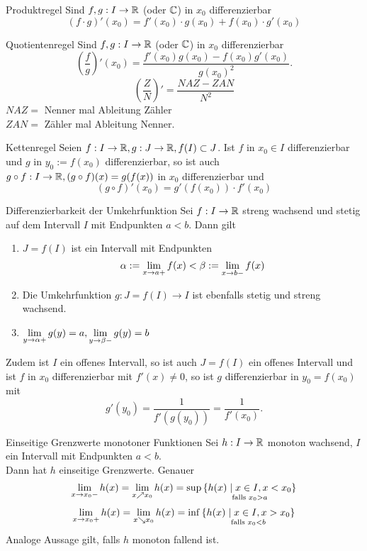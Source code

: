 \documentclass[main.tex]{subfiles}
\begin{document}
\begin{karte}{Produktregel}
    Sind \( f, g: I \rightarrow \mathbb{R} \) (oder \( \mathbb{C} \)) in \(x_0\)
    differenzierbar
    \[ (f \cdot g)'(x_0) = f'(x_0) \cdot g(x_0) 
    + f(x_0) \cdot g'(x_0) \]
\end{karte}
\begin{karte}{Quotientenregel}
    Sind \( f, g: I \rightarrow \mathbb{R} \) (oder \( \mathbb{C} \)) in \(x_0\)
    differenzierbar
    \[ \left( \frac{f}{g} \right)'(x_0) 
    = \frac{ f'(x_0) g(x_0) - f(x_0) g'(x_0) }{ {g(x_0)}^2 }. \]
    \[ \left(\frac{Z}{N}\right)' = \frac{NAZ - ZAN}{N^2} \]
    \( NAZ = \) Nenner mal Ableitung Zähler\\
    \( ZAN = \) Zähler mal Ableitung Nenner.
\end{karte}
\begin{karte}{Kettenregel}
    Seien \( f: I \rightarrow \mathbb{R}, g : J \rightarrow \mathbb{R}, f(I) \subset J \). 
    Ist \( f \) in \( x_0 \in I \) differenzierbar und \(g\) in 
    \( y_0 := f(x_0) \) differenzierbar, so ist auch 
    \( g \circ f : I \rightarrow \mathbb{R}, (g \circ f)(x) = g(f(x)) \) in \(x_0\) 
    differenzierbar und 
    \[ (g \circ f)'(x_0) = g'(f(x_0)) \cdot f'(x_0) \]
\end{karte}
\begin{karte}{Differenzierbarkeit der Umkehrfunktion}
    Sei \( f: I \rightarrow \mathbb{R} \) streng wachsend und stetig auf 
    dem Intervall \(I\) mit Endpunkten \( a < b \). Dann gilt 
    \begin{enumerate}
        \item \( J = f(I) \) ist ein Intervall mit Endpunkten 
        \[ \alpha := \lim\limits_{x\rightarrow a +} f(x) 
        < \beta := \lim\limits_{x\rightarrow b -} f(x) \]
        \item Die Umkehrfunktion \( g: J = f(I) \rightarrow I \) ist 
        ebenfalls stetig und streng wachsend.
        \item \( \lim\limits_{y\rightarrow \alpha +} g(y) = a, 
        \lim\limits_{y\rightarrow \beta -} g(y) = b \)
    \end{enumerate}
    Zudem ist \( I \) ein offenes Intervall, so ist auch \( J = f(I) \) 
    ein offenes Intervall und ist \(f\) in \(x_0\) differenzierbar mit 
    \( f'(x) \neq 0 \), so ist \(g\) differenzierbar in \( y_0 = f(x_0) \) 
    mit 
    \[ g'(y_0) = \frac{1}{f'(g(y_0))} = \frac{1}{f'(x_0)}. \]
\end{karte}
\begin{karte}{Einseitige Grenzwerte monotoner Funktionen}
    Sei \( h: I \rightarrow \mathbb{R} \) monoton wachsend, \(I\) ein Intervall mit 
    Endpunkten \( a < b \).\\
    Dann hat \(h\) einseitige Grenzwerte. Genauer
    \[ \lim\limits_{x\rightarrow x_0 -} h(x) = \lim\limits_{x \nearrow x_0} h(x) 
    = \sup \underset{\text{falls } x_0 > a}{\{ h(x) 
    \; \vert \; x \in I, x < x_0 \}} \]
    \[ \lim\limits_{x\rightarrow x_0 +} h(x) = \lim\limits_{x \searrow x_0} h(x) 
    = \inf \underset{\text{falls } x_0 < b}{\{ h(x) 
    \; \vert \; x \in I, x > x_0 \}} \]
    Analoge Aussage gilt, falls \(h\) monoton fallend ist.
\end{karte}
\end{document}
